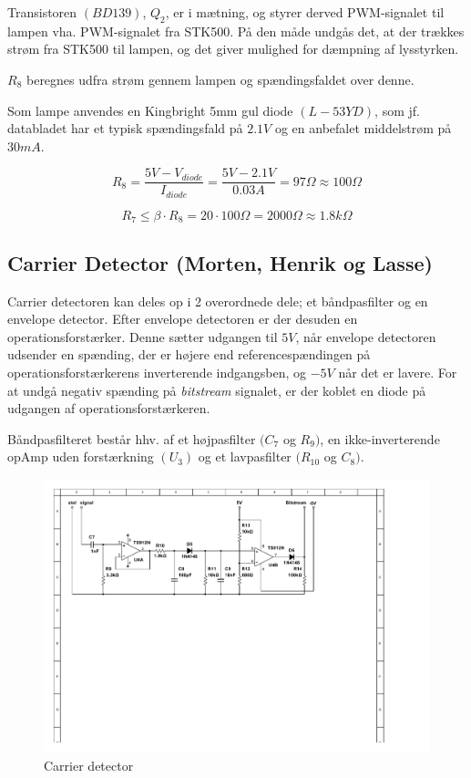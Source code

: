 Transistoren $(BD139)$\cite{lib:BD139}, $Q_{2}$, er i mætning, og styrer derved PWM-signalet til lampen vha. PWM-signalet fra STK500. På den måde undgås det, at der trækkes strøm fra STK500 til lampen, og det giver mulighed for dæmpning af lysstyrken.

$R_{8}$ beregnes udfra strøm gennem lampen og spændingsfaldet over denne. 

Som lampe anvendes en Kingbright 5mm gul diode $(L-53 YD)$\cite{lib:LED}, som jf. databladet har et typisk spændingsfald på $2.1V$ og en anbefalet middelstrøm på $30mA$.

\begin{displaymath}
R_{8} = \dfrac{5V-V_{diode}}{I_{diode}} = \dfrac{5V-2.1V}{0.03A} = 97\Omega \approx 100\Omega
\end{displaymath}

\begin{displaymath}
R_{7}\leq \beta \cdot R_{8} = 20 \cdot 100\Omega = 2000\Omega \approx 1.8k\Omega
\end{displaymath}

\subsection{Carrier Detector (Morten, Henrik og Lasse)}
Carrier detectoren kan deles op i 2 overordnede dele; et båndpasfilter og en envelope detector. Efter envelope detectoren er der desuden en operationsforstærker. Denne sætter udgangen til $5V$, når envelope detectoren udsender en spænding, der er højere end referencespændingen på operationsforstærkerens inverterende indgangsben, og $-5V$ når det er lavere. For at undgå negativ spænding på \textit{bitstream} signalet, er der koblet en diode på udgangen af operationsforstærkeren.

Båndpasfilteret består hhv. af et højpasfilter $(C_{7}$ og $R_{9})$, en ikke-inverterende opAmp uden forstærkning $(U_{3})$ og et lavpasfilter $(R_{10}$ og $C_{8})$.
\begin{figure}[h]
	\centering
	\includegraphics[scale=0.75, trim=40 340 240 40, clip=true]{../HardwareDesign/Diagrammer/CarrierDetector.pdf}
	\caption{Carrier detector}
	\label{fig:CarDetek}
\end{figure}

